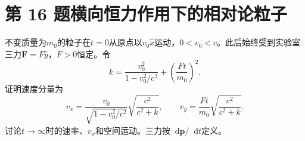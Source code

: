 \documentclass[UTF8,fontset=fandol,a4paper,11pt]{ctexart}
\newcommand{\dd}{\mathop{}\!\mathrm{d}}
\begin{document}


\section*{第 16 题\quad 横向恒力作用下的相对论粒子}\label{q:16}

不变质量为$m_0$的粒子在$t=0$从原点以$v_0\hat x$运动，$0<v_0<c$。此后始终受到实验室三力$\boldsymbol F=F\hat y$，$F>0$恒定。令
\[
k=\frac{v_0^2}{1-v_0^2/c^2}+\left(\frac{Ft}{m_0}\right)^2.
\]
证明速度分量为
\[
v_x=\frac{v_0}{\sqrt{1-v_0^2/c^2}}\sqrt{\frac{c^2}{c^2+k}},
\qquad
v_y=\frac{Ft}{m_0}\sqrt{\frac{c^2}{c^2+k}}.
\]
讨论$t\to\infty$时的速率、$v_x$和空间运动。三力按$\dd\boldsymbol p/\dd t$定义。
\end{document}
